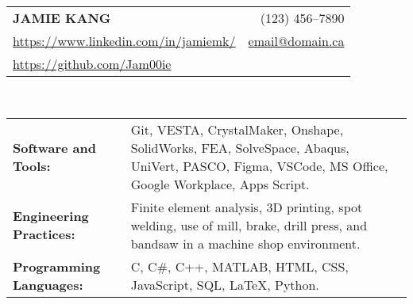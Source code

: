 \documentclass[10pt]{article}
\begin{document}
\pagestyle{empty}
\small\sffamily


    {\setlength{\tabcolsep}{0pt}
    \begin{tabularx}{\linewidth}[t]{l@{\extracolsep{\fill}}r}
        {\huge\bfseries{JAMIE KANG}} & (123) 456--7890 \\
        \url{https://www.linkedin.com/in/jamiemk/} & \url{email@domain.ca} \\
        \url{https://github.com/Jam00ie} & \\

    \end{tabularx} \\
    }
    \vspace{0.2in}


    \begin{rsbox}[frametitle = {SKILLS}]

        \begin{tabularx}{\textwidth}[t]{lX}
            \textbf{Software and Tools:} & 
            Git, VESTA, CrystalMaker, Onshape, SolidWorks, FEA, SolveSpace, Abaqus, UniVert, PASCO, Figma, VSCode, MS Office, Google Workplace, Apps Script.\\
            \textbf{Engineering Practices:} & 
            Finite element analysis, 3D printing, spot welding, use of mill, brake, drill press, and bandsaw in a machine shop environment.\\
            \textbf{Programming Languages:} & 
            C, C\#, C++, MATLAB, HTML, CSS, JavaScript, SQL, \textrm{\LaTeX{}}, Python.\\
        \end{tabularx}

    \end{rsbox}

\end{document}
